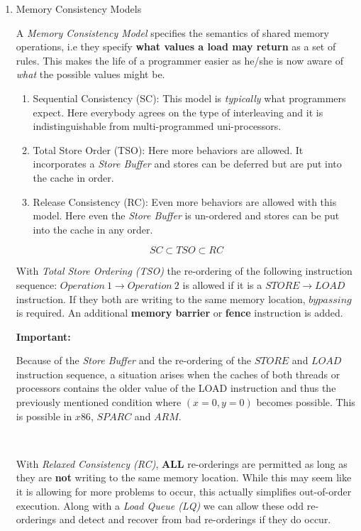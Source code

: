 \documentclass[12pt]{article}
\newenvironment{QandA}{\begin{enumerate}[label=\bfseries\arabic*.]\bfseries}
                      {\end{enumerate}}
\newenvironment{answered}{\par\quad\normalfont}{}
\begin{document}
\begin{QandA}
\item Memory Consistency Models
\begin{answered}
A \textit{Memory Consistency Model} specifies the semantics of shared memory operations, i.e they specify \textbf{what values a load may return} as a set of rules. This makes the life of a programmer easier as he/she is now aware of \textit{what} the possible values might be. 
\begin{enumerate}
    \item Sequential Consistency (SC): This model is \textit{typically} what programmers expect. Here everybody agrees on the type of interleaving and it is indistinguishable from multi-programmed uni-processors.
    \item Total Store Order (TSO): Here more behaviors are allowed. It incorporates a \textit{Store Buffer} and stores can be deferred but are put into the cache in order.
    \item Release Consistency (RC): Even more behaviors are allowed with this model. Here even the \textit{Store Buffer} is un-ordered and stores can be put into the cache in any order.  
\end{enumerate}
\begin{equation*}
    SC \subset TSO \subset RC
\end{equation*}

With \textit{Total Store Ordering (TSO)} the re-ordering of the following instruction sequence: $Operation\ 1 \rightarrow Operation\ 2$ is allowed if it is a $STORE \rightarrow LOAD$ instruction. If they both are writing to the same memory location, $bypassing$ is required. An additional \textbf{memory barrier} or \textbf{fence} instruction is added. 

\textbf{Important:}  

Because of the \textit{Store Buffer} and the re-ordering of the $STORE$ and $LOAD$ instruction sequence, a situation arises when the caches of both threads or processors contains the older value of the LOAD instruction and thus the previously mentioned condition where $(x=0,y=0)$ becomes possible. This is possible in $x86$, $SPARC$ and $ARM$.

\ 

With \textit{Relaxed Consistency (RC)}, \textbf{ALL} re-orderings are permitted as long as they are \textbf{not} writing to the same memory location. While this may seem like it is allowing for more problems to occur, this actually simplifies out-of-order execution. Along with a \textit{Load Queue (LQ)} we can allow these odd re-orderings and detect and recover from bad re-orderings if they do occur. 

\end{answered}



\end{QandA}
\end{document}
